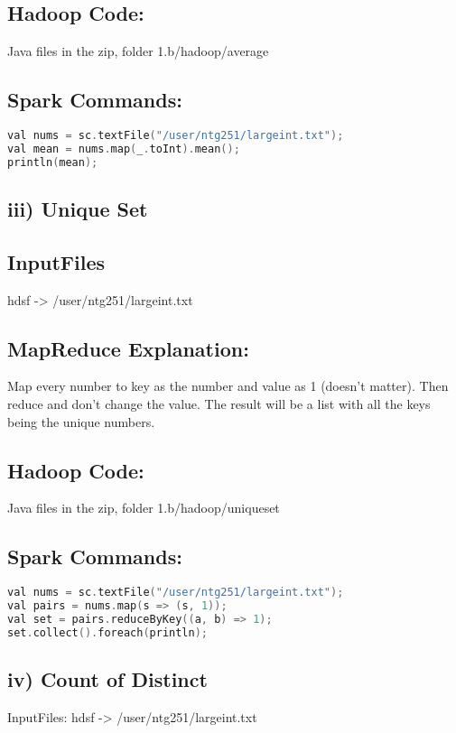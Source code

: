 \subsection*{Hadoop Code:}
Java files in the zip, folder 1.b/hadoop/average

\subsection*{Spark Commands:}
\begin{lstlisting}[language=c++]
val nums = sc.textFile("/user/ntg251/largeint.txt");
val mean = nums.map(_.toInt).mean();
println(mean);
\end{lstlisting}

\subsection*{iii) Unique Set}
\subsection*{InputFiles}
hdsf -> /user/ntg251/largeint.txt

\subsection*{MapReduce Explanation:}
Map every number to key as the number and value as 1 (doesn't matter). Then reduce and don't change the value. The result will be a list with all the keys being the unique numbers.

\subsection*{Hadoop Code:}
Java files in the zip, folder 1.b/hadoop/uniqueset

\subsection*{Spark Commands:}
\begin{lstlisting}[language=c++]
val nums = sc.textFile("/user/ntg251/largeint.txt");
val pairs = nums.map(s => (s, 1));
val set = pairs.reduceByKey((a, b) => 1);
set.collect().foreach(println);
\end{lstlisting}

\subsection*{iv) Count of Distinct}
InputFiles: hdsf -> /user/ntg251/largeint.txt

